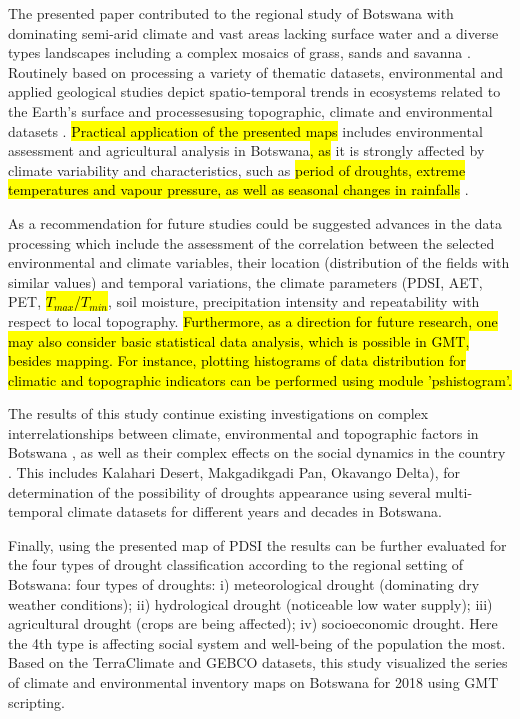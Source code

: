 \documentclass[ijgi,article,submit,pdftex,moreauthors]{Definitions/mdpi}
\begin{document}
The presented paper contributed to the regional study of Botswana with dominating semi-arid climate and vast areas lacking surface water and a diverse types landscapes including a complex mosaics of grass, sands and savanna \cite{Campbell}. Routinely based on processing a variety of thematic datasets, environmental and applied geological studies depict spatio-temporal trends in ecosystems related to the Earth’s surface and processesusing topographic, climate and environmental datasets  \cite{AkinyemiKgomo,Ishimoto,Klauco2013,Eze,Lemenkova202212,Chipanshi,Klauco2017}. \hl{Practical application of the presented maps} includes environmental assessment and agricultural analysis in Botswana\hl{, as }it is strongly affected by climate variability and characteristics, such as \hl{period of droughts, extreme temperatures and vapour pressure, as well as seasonal changes in rainfalls} \cite{Maruatona}.

As a recommendation for future studies could be suggested advances in the data processing which include the assessment of the correlation between the selected environmental and climate variables, their location (distribution of the fields with similar values) and temporal variations, the climate parameters (PDSI, AET, PET, \hl{$T_{max}$/$T_{min}$}, soil moisture, precipitation intensity and repeatability with respect to local topography. \hl{Furthermore, as a direction for future research, one may also consider basic statistical data analysis, which is possible in GMT, besides mapping. For instance, plotting histograms of data distribution for climatic and topographic indicators can be performed using module 'pshistogram'.}

The results of this study continue existing investigations on complex interrelationships between climate, environmental and topographic factors in Botswana \cite{McGill,Maoyi,Ramberg2006b,Maoyi}, as well as their complex effects on the social dynamics in the country  \cite{Asefa,Vanderpost1995,Rahm,Mogomotsi}. This includes Kalahari Desert, Makgadikgadi Pan, Okavango Delta), for determination of the possibility of droughts appearance using several multi-temporal climate datasets for different years and decades in Botswana. 

Finally, using the presented map of PDSI the results can be further evaluated for the four types of drought classification according to the regional setting of Botswana: four types of droughts: i) meteorological drought (dominating dry weather conditions); ii) hydrological drought (noticeable low water supply); iii) agricultural drought (crops are being affected); iv) socioeconomic drought. Here the 4th type is affecting social system and well-being of the population the most. Based on the TerraClimate and GEBCO datasets, this study visualized the series of climate and environmental inventory maps on Botswana for 2018 using GMT scripting.
\end{document}
